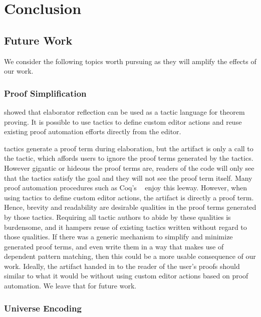 \section{Conclusion}\label{sec:conclusion}

\subsection{Future Work}

We consider the following topics worth pursuing as they will amplify the effects
of our work.

\subsubsection{Proof Simplification}
\label{sssec:simplification}

\citet{elabref} showed that elaborator reflection can be used as a tactic
language for theorem proving. It is possible to use \Elab{} tactics to define
custom editor actions and reuse existing proof automation efforts directly from
the editor.

\Elab{} tactics generate a proof term during elaboration, but the artifact is
only a call to the tactic, which affords users to ignore the proof terms
generated by the tactics. However gigantic or hideous the proof terms are,
readers of the code will only see that the tactics satisfy the goal and they
will not see the proof term itself. Many proof automation procedures such as
Coq's ~\cite{omega} enjoy this leeway.
However, when using \Elab{} tactics to
define custom editor actions, the artifact is directly a proof term. Hence,
brevity and readability are desirable qualities in the proof terms generated by
those tactics.
Requiring all tactic authors to abide by these qualities is burdensome, and it
hampers reuse of existing tactics written without regard to those qualities.
If there was a generic mechanism to simplify and minimize
generated proof terms, and even write them in a way that makes use of dependent
pattern matching, then this could be a more usable consequence of our work.
Ideally, the artifact handed in to the reader of the user's proofs should
similar to what it would be without using custom editor actions based on proof
automation.  We leave that for future work.

\subsubsection{Universe Encoding}
\label{sssec:universeEncoding}


